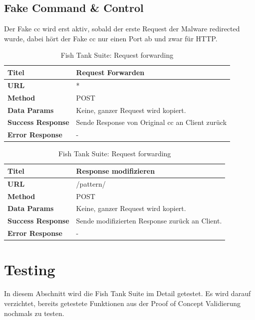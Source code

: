 \subsection{Fake Command \& Control}

Der Fake \gls{cc} wird erst aktiv, sobald der erste Request der Malware redirected wurde, dabei hört der Fake \gls{cc} nur einen Port ab und zwar für HTTP.

\begin{table}[H]
    \centering
	\begin{tabularx}{\textwidth}{| l | X |}
        \hline
        \textbf{Titel} & Request Forwarden \\\hline        
        \textbf{URL} & * \\ \hline
        \textbf{Method} & POST\\ \hline
        \textbf{Data Params} & Keine, ganzer Request wird kopiert. \\ \hline
        \textbf{Success Response} & Sende Response von Original \gls{cc} an Client zurück \\ \hline
        \textbf{Error Response} & - \\ \hline
    \end{tabularx}
    \caption{Fish Tank Suite: Request forwarding}
\end{table}

\begin{table}[H]
    \centering
	\begin{tabularx}{\textwidth}{| l | X |}
        \hline
        \textbf{Titel} & Response modifizieren \\\hline        
        \textbf{URL} & /pattern/ \\ \hline
        \textbf{Method} & POST\\ \hline
        \textbf{Data Params} & Keine, ganzer Request wird kopiert. \\ \hline
        \textbf{Success Response} & Sende modifizierten Response zurück an Client. \\ \hline
        \textbf{Error Response} & - \\ \hline
    \end{tabularx}
    \caption{Fish Tank Suite: Request forwarding}
\end{table}

\section{Testing}
In diesem Abschnitt wird die Fish Tank Suite im Detail getestet. Es wird darauf verzichtet, bereits getestete Funktionen aus der Proof of Concept Validierung nochmals zu testen.

